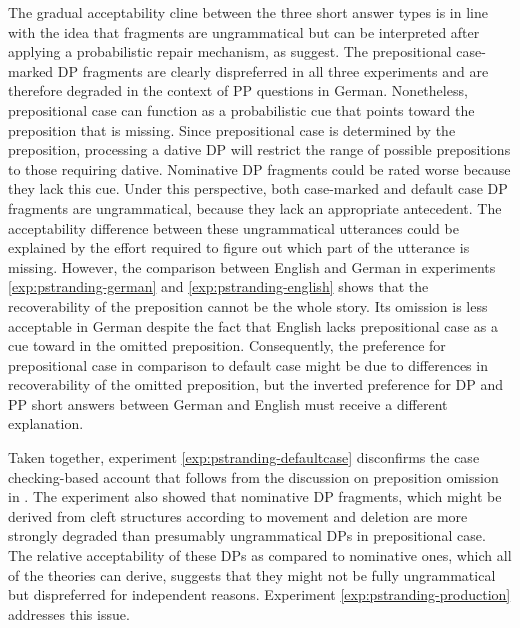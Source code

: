 \noindent The gradual acceptability cline between the three short answer types is in line with the idea that fragments are ungrammatical but can be interpreted after applying a probabilistic repair mechanism, as \citet{bergen.goodman2015} suggest. The prepositional case-marked DP fragments are clearly dispreferred in all three experiments and are therefore degraded in the context of PP questions in German. Nonetheless, prepositional case can function as a probabilistic cue that points toward the preposition that is missing. Since prepositional case is determined by the preposition, processing a dative DP will restrict the range of possible prepositions to those requiring dative. Nominative DP fragments could be rated worse because they lack this cue. Under this perspective, both case-marked and default case DP fragments are ungrammatical, because they lack an appropriate antecedent. The acceptability difference between these ungrammatical utterances could be explained by the effort required to figure out which part of the utterance is missing. However, the comparison between English and German in experiments \ref{exp:pstranding-german} and \ref{exp:pstranding-english} shows that the recoverability of the preposition cannot be the whole story. Its omission is less acceptable in German despite the fact that English lacks prepositional case as a cue toward in the omitted preposition. Consequently, the preference for prepositional case in comparison to default case might be due to differences in recoverability of the omitted preposition, but the inverted preference for DP and PP short answers between German and English must receive a different explanation. 

Taken together, experiment \ref{exp:pstranding-defaultcase} disconfirms the case checking-based account that follows from the discussion on preposition omission in \citet{barton.progovac2005}. The experiment also showed that nominative DP fragments, which might be derived from cleft structures according to movement and deletion are more strongly degraded than presumably ungrammatical DPs in prepositional case. The relative acceptability of these DPs as compared to nominative ones, which all of the theories can derive, suggests that they might not be fully ungrammatical but dispreferred for independent reasons. Experiment \ref{exp:pstranding-production} addresses this issue.

